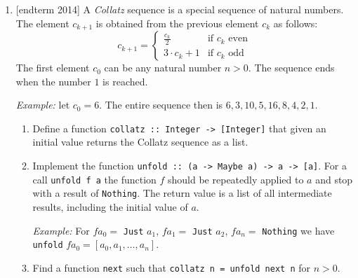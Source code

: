 \documentclass{article}
\begin{document}
\begin{enumerate}
    \item {[endterm 2014]} A \textit{Collatz} sequence is a special sequence of natural numbers. The element $c_{k+1}$ is obtained from the previous element $c_k$ as follows:
    \[
    c_{k+1} =
    \begin{cases}
      \frac{c_k}{2} & \text{if $c_k$ even} \\
      3 \cdot c_k + 1 & \text{if $c_k$ odd}
    \end{cases}
    \]
    The first element $c_0$ can be any natural number $n > 0$. The sequence ends when the number $1$ is reached. \par
    \textit{Example:} let $c_0 = 6$. The entire sequence then is $6,3,10,5,16,8,4,2,1$.
    \begin{enumerate}
    \item Define a function \verb|collatz :: Integer -> [Integer]| that given an initial value returns the Collatz sequence as a list.
    \item Implement the function \verb|unfold :: (a -> Maybe a) -> a -> [a]|. For a call \verb|unfold f a| the function $f$ should be repeatedly applied to $a$ and stop with a result of \verb|Nothing|. The return value is a list of all intermediate results, including the initial value of $a$. \par
    \textit{Example:} For $f a_0 =$ \verb|Just| $a_1$, $f a_1 =$ \verb|Just| $a_2$, $f a_n =$ \verb|Nothing| we have \verb|unfold| $f a_0 = [a_0, a_1, \dots, a_n]$.
    \item Find a function \verb|next| such that \verb|collatz n = unfold next n| for $n > 0$.
    \end{enumerate}


\end{enumerate}
\end{document}
